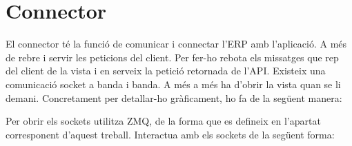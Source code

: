 \documentclass[letterpaper,11pt,catalan]{sphinxmanual}
\begin{document}
\begin{sphinxVerbatim}[commandchars=\\\{\}]
    
         
            
           
           

     
         
            
           
           
\end{sphinxVerbatim}


\section{Connector}
\label{\detokenize{index:connector}}
El connector té la funció de comunicar i connectar l'ERP amb l'aplicació. A més de rebre i servir les peticions del client. Per fer-ho rebota els missatges que rep del client de la vista i en serveix la petició retornada de l'API.
Existeix una comunicació socket a banda i banda.
A més a més ha d'obrir la vista quan se li demani.
Concretament per detallar-ho gràficament, ho fa de la següent manera:


Per obrir els sockets utilitza ZMQ, de la forma que es defineix en l'apartat corresponent d'aquest treball.
Interactua amb els sockets de la següent forma:
\end{document}

